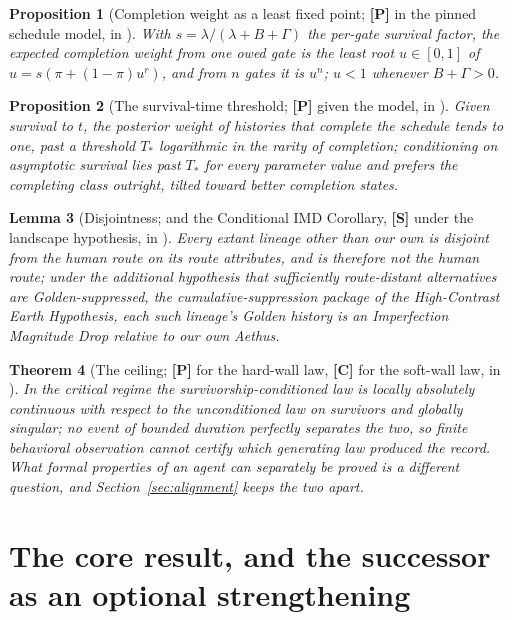 \documentclass[11pt]{article}
\theoremstyle{plain}
\newtheorem{theorem}{Theorem}[section]
\newtheorem{proposition}[theorem]{Proposition}
\newtheorem{lemma}[theorem]{Lemma}
\theoremstyle{definition}
\theoremstyle{remark}
\begin{document}
\begin{proposition}[Completion weight as a least fixed point; \textbf{[P]}
in the pinned schedule model, in \cite{TechnoC}]\label{imp:fixedpoint}
With $s=\lambda/(\lambda+B+\Gamma)$ the per-gate survival factor, the
expected completion weight from one owed gate is the least root
$u\in[0,1]$ of $u=s(\pi+(1-\pi)u^{r})$, and from $n$ gates it is $u^{n}$;
$u<1$ whenever $B+\Gamma>0$.
\end{proposition}

\begin{proposition}[The survival-time threshold; \textbf{[P]} given the
model, in \cite{TechnoC}]\label{imp:threshold}
Given survival to $t$, the posterior weight of histories that complete
the schedule tends to one, past a threshold $T_\ast$ logarithmic in the
rarity of completion; conditioning on asymptotic survival lies past
$T_\ast$ for every parameter value and prefers the completing class
outright, tilted toward better completion states.
\end{proposition}

\begin{lemma}[Disjointness; and the Conditional IMD Corollary,
\textbf{[S]} under the landscape hypothesis, in \cite{RouteWorld}]
\label{imp:condimd}
Every extant lineage other than our own is disjoint from the human
route on its route attributes, and is therefore not the human route;
under the additional hypothesis that sufficiently route-distant
alternatives are Golden-suppressed, the cumulative-suppression package
of the High-Contrast Earth Hypothesis, each such lineage's Golden
history is an Imperfection Magnitude Drop relative to our own Aethus.
\end{lemma}

\begin{theorem}[The ceiling; \textbf{[P]} for the hard-wall law,
\textbf{[C]} for the soft-wall law, in \cite{SurvA}]\label{imp:ceiling}
In the critical regime the survivorship-conditioned law is locally
absolutely continuous with respect to the unconditioned law on
survivors and globally singular; no event of bounded duration perfectly
separates the two, so finite behavioral observation cannot certify
which generating law produced the record. What formal properties of an
agent can separately be proved is a different question, and
Section~\ref{sec:alignment} keeps the two apart.
\end{theorem}

\section{The core result, and the successor as an optional strengthening}\label{sec:core}
\end{document}
